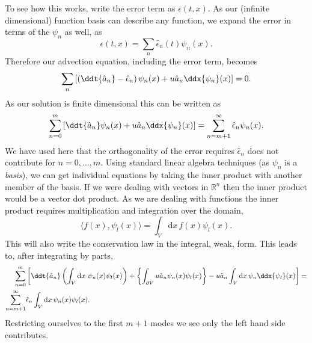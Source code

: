 To see how this works, write the error term as $\epsilon(t, x)$.
As our (infinite dimensional) function basis can describe any function, we
expand the error in terms of the $\psi_n$ as well, as
%
\begin{equation}
  \label{eq:dg_error}
  \epsilon(t, x) = \sum_n \hat{\epsilon}_n(t) \psi_n(x).
\end{equation}
%
Therefore our advection equation, including the error term, becomes
%
\begin{equation}
  \label{eq:dg_advection}
  \sum_n \left[ \left( \ddt{\hat{a}_n} - \hat{\epsilon}_n \right) \psi_n(x) +
  u \hat{a}_n \ddx{\psi_n}(x) \right] = 0.
\end{equation}
%
As our solution is finite dimensional this can be written as
%
\begin{equation}
  \label{eq:dg_advection2}
    \sum_{n=0}^{m} \left[ \ddt{\hat{a}_n} \psi_n(x) +
    u \hat{a}_n \ddx{\psi_n}(x) \right] =
    \sum_{n=m+1}^{\infty} \hat{\epsilon}_n \psi_n(x).
\end{equation}
%
We have used here that the orthogonality of the error requires $\hat{\epsilon}_n$
does not contribute for $n = 0, \dots, m$.
Using standard linear algebra techniques (as $\psi_n$ is a \emph{basis}), we can
get individual equations by taking the inner product with another member of the
basis. If we were dealing with vectors in $\mathbb{R}^n$ then the inner product
would be a vector dot product. As we are dealing with functions the inner
product requires multiplication and integration over the domain,
%
\begin{equation}
  \label{eq:dg_inner_product}
  \langle f(x), \psi_l(x) \rangle = \int_V \text{d} x \, f(x) \psi_l(x).
\end{equation}
%
This will also write the conservation law in the integral, weak, form.
This leads to, after integrating by parts,
%
\begin{equation}
  \label{eq:dg_advection3}
  \begin{split}
    \sum_{n=0}^{m} & \left[ \ddt{\hat{a}_n} \left( \int_V \text{d} x \ \psi_n(x) \psi_l(x) \right) + \left\{ \int_{\partial V} u \hat{a}_n \psi_n(x) \psi_l(x) \right\} -
    u \hat{a}_n \int_V \text{d} x \, \psi_n \ddx{\psi_l }(x) \right] = \\ \sum_{n=m+1}^{\infty} & \hat{\epsilon}_n \int_V \text{d} x\, \psi_n(x) \psi_l(x).
  \end{split}
\end{equation}
%
Restricting ourselves to the first $m+1$ modes we see only the left hand side
contributes.

